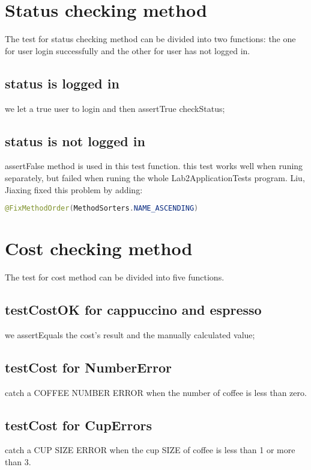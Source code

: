 \documentclass[a4paper]{report}
\begin{document}
\section{Status checking method}
\par The test for status checking method can be divided into two functions: the one for user login successfully and the other for user has not logged in.
\subsection{status is logged in }
\par we let a true user to login and then assertTrue checkStatus;

\subsection{status is not logged in}
\par assertFalse method is used in this test function.
this test works well when runing separately, but failed when runing the whole Lab2ApplicationTests program.
Liu, Jiaxing fixed this problem by adding:
\begin{lstlisting}[language=java]
    @FixMethodOrder(MethodSorters.NAME_ASCENDING)
\end{lstlisting}

\section{Cost checking method}
\par The test for cost method can be divided into five functions.

\subsection{testCostOK for cappuccino and espresso}
\par we assertEquals the cost's result and the manually calculated value;

\subsection{testCost for NumberError}
\par catch a COFFEE NUMBER ERROR when the number of coffee is less than zero.

\subsection{testCost for CupErrors}
\par catch a CUP SIZE ERROR when the cup SIZE of coffee is less than 1 or more than 3.
\end{document}
